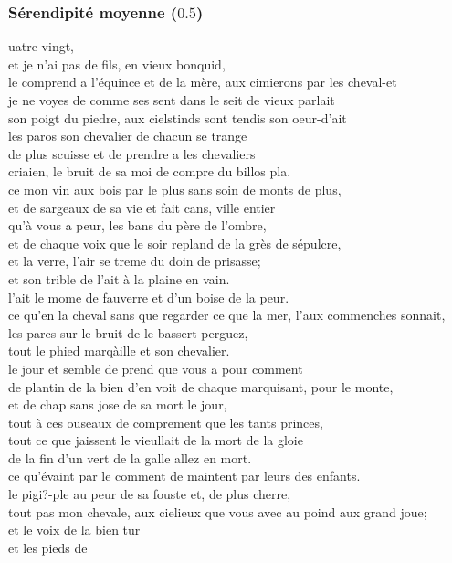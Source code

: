\documentclass{article}
\begin{document}
			\subsubsection{Sérendipité moyenne ($0.5$)}
				uatre vingt,\\
				et je n'ai pas de fils, en vieux bonquid,\\
				le comprend a l'équince et de la mère, aux cimierons par les cheval-et\\
				je ne voyes de comme ses sent dans le seit de vieux parlait\\
				son poigt du piedre, aux cielstinds sont tendis son oeur-d'ait\\
				les paros son chevalier de chacun se trange\\
				de plus scuisse et de prendre a les chevaliers\\
				criaien, le bruit de sa moi de compre du billos pla.\\
				ce mon vin aux bois par le plus sans soin de monts de plus,\\
				et de sargeaux de sa vie et fait cans, ville entier\\
				qu'à vous a peur, les bans du père de l'ombre,\\
				et de chaque voix que le soir repland de la grès de sépulcre,\\
				et la verre, l'air se treme du doin de prisasse;\\
				et son trible de l'ait à la plaine en vain.\\
				l'ait le mome de fauverre et d'un boise de la peur.\\
				ce qu'en la cheval sans que regarder ce que la mer, l'aux commenches sonnait,\\
				les parcs sur le bruit de le bassert perguez,\\
				tout le phied marqàille et son chevalier.\\
				
				le jour et semble de prend que vous a pour comment\\
				de plantin de la bien d'en voit de chaque marquisant, pour le monte,\\
				et de chap sans jose de sa mort le jour,\\
				tout à ces ouseaux de comprement que les tants princes,\\
				tout ce que jaissent le vieullait de la mort de la gloie\\
				de la fin d'un vert de la galle allez en mort.\\
				ce qu'évaint par le comment de maintent par leurs des enfants.\\
				le pigi?-ple au peur de sa fouste et, de plus cherre,\\
				tout pas mon chevale, aux cielieux que vous avec au poind aux grand joue;\\
				et le voix de la bien tur\\
				et les pieds de \\
\end{document}
